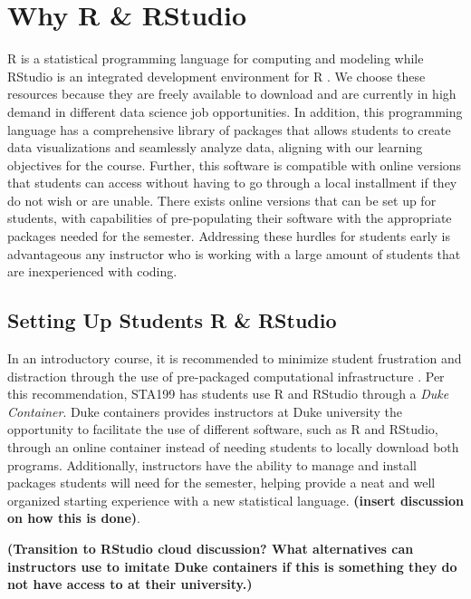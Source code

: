 \documentclass[
  12pt]{article}
\begin{document}
\hypertarget{why-r-rstudio}{%
\section{Why R \& RStudio}\label{why-r-rstudio}}

R is a statistical programming language for computing and modeling while
RStudio is an integrated development environment for R \citep{Rcite}. We
choose these resources because they are freely available to download and
are currently in high demand in different data science job
opportunities. In addition, this programming language has a
comprehensive library of packages that allows students to create data
visualizations and seamlessly analyze data, aligning with our learning
objectives for the course. Further, this software is compatible with
online versions that students can access without having to go through a
local installment if they do not wish or are unable. There exists online
versions that can be set up for students, with capabilities of
pre-populating their software with the appropriate packages needed for
the semester. Addressing these hurdles for students early is
advantageous any instructor who is working with a large amount of
students that are inexperienced with coding.

\hypertarget{setting-up-students-r-rstudio}{%
\subsection{Setting Up Students R \&
RStudio}\label{setting-up-students-r-rstudio}}

In an introductory course, it is recommended to minimize student
frustration and distraction through the use of pre-packaged
computational infrastructure \citep{Rundel2018}. Per this
recommendation, STA199 has students use R and RStudio through a
\emph{Duke Container}. Duke containers provides instructors at Duke
university the opportunity to facilitate the use of different software,
such as R and RStudio, through an online container instead of needing
students to locally download both programs. Additionally, instructors
have the ability to manage and install packages students will need for
the semester, helping provide a neat and well organized starting
experience with a new statistical language. \textbf{(insert discussion
on how this is done)}.

\textbf{(Transition to RStudio cloud discussion? What alternatives can
instructors use to imitate Duke containers if this is something they do
not have access to at their university.)}
\end{document}
